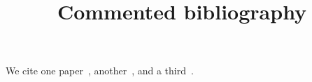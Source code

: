 \documentclass[aps,pra,reprint]{revtex4-2}
\begin{document}
\title{Commented bibliography}
\maketitle
We cite one paper~\cite{alpha}, another~\cite{beta}, and a third~\cite{gamma}.


%
%
\end{document}
